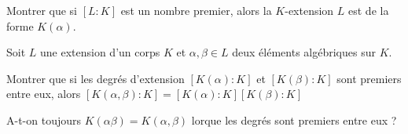 \documentclass[french]{report}
\begin{document}
\begin{exo}
    Montrer que si \([L\colon K]\) est un nombre premier, alors la \(K\)-extension
    \(L\) est de la forme \(K(\alpha)\).
\end{exo}

\begin{exo}
    Soit \(L\) une extension d'un corps \(K\) et \(\alpha,\beta\in L\) deux éléments
    algébriques sur \(K\).
    \begin{q}{1}
        Montrer que si les degrés d'extension \([K(\alpha)\colon K]\) et \([K(\beta)
        \colon K]\) sont premiers entre eux, alors \([K(\alpha,\beta)\colon K]=
        [K(\alpha)\colon K][K(\beta)\colon K]\)
    \end{q}
    \begin{q}{2}
        A-t-on toujours \(K(\alpha\beta)=K(\alpha,\beta)\) lorque les degrés sont
        premiers entre eux ?
    \end{q}
\end{exo}
\end{document}
